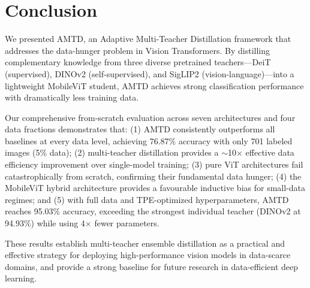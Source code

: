 \documentclass[journal]{IEEEtran}
\begin{document}
\section{Conclusion}
\label{sec:conclusion}

We presented AMTD, an Adaptive Multi-Teacher Distillation framework that addresses the
data-hunger problem in Vision Transformers. By distilling complementary knowledge from
three diverse pretrained teachers---DeiT (supervised), DINOv2 (self-supervised), and
SigLIP2 (vision-language)---into a lightweight MobileViT student, AMTD achieves strong
classification performance with dramatically less training data.

Our comprehensive from-scratch evaluation across seven architectures and four data
fractions demonstrates that:
(1) AMTD consistently outperforms all baselines at every data level, achieving 76.87\%
accuracy with only 701 labeled images (5\% data);
(2) multi-teacher distillation provides a $\sim$10$\times$ effective data efficiency
improvement over single-model training;
(3) pure ViT architectures fail catastrophically from scratch, confirming their
fundamental data hunger;
(4) the MobileViT hybrid architecture provides a favourable inductive bias for
small-data regimes; and
(5) with full data and TPE-optimized hyperparameters, AMTD reaches 95.03\% accuracy,
exceeding the strongest individual teacher (DINOv2 at 94.93\%) while using 4$\times$ fewer
parameters.

These results establish multi-teacher ensemble distillation as a practical and effective
strategy for deploying high-performance vision models in data-scarce domains, and provide a
strong baseline for future research in data-efficient deep learning.
\end{document}
